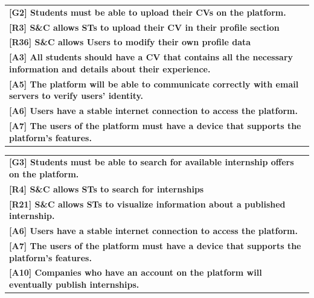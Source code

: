\begin{center}
    \begin{tabular}{|p{37em}|}
        \rowcolor{bluepoli!40} %
        \hline
        \textbf{[G2] Students must be able to upload their CVs on the platform.} \\
        \rowcolor{bluepoli!15}
        \textbf{[R3] S\&C allows STs to upload their CV in their profile section} \\
        \rowcolor{bluepoli!15}
        \textbf{[R36] S\&C allows Users to modify their own profile data} \\
        \textbf{[A3] All students should have a CV that contains all the necessary information and details about their experience.} \\
        \textbf{[A5] The platform will be able to communicate correctly with email servers to verify users’ identity.}\\
        \textbf{[A6] Users have a stable internet connection to access the platform.}\\
        \textbf{[A7] The users of the platform must have a device that supports the platform's features.}\\
        \hline
    \end{tabular}
\end{center}

\begin{center}
    \begin{tabular}{|p{37em}|}
        \rowcolor{bluepoli!40} %
        \hline
        \textbf{[G3] Students must be able to search for available internship offers on the platform.} \\
        \rowcolor{bluepoli!15}
        \textbf{[R4] S\&C allows STs to search for internships} \\
        \rowcolor{bluepoli!15}
        \textbf{[R21] S\&C allows STs to visualize information about a published internship.} \\
        \textbf{[A6] Users have a stable internet connection to access the platform.}\\
        \textbf{[A7] The users of the platform must have a device that supports the platform's features.}\\
        \textbf{[A10] Companies who have an account on the platform will eventually publish internships.}\\
        \hline
    \end{tabular}
\end{center}

